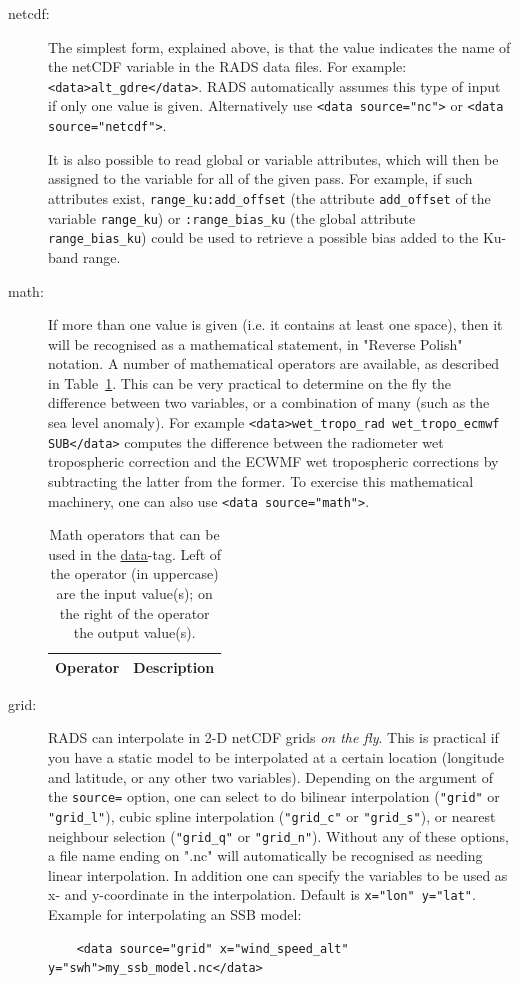 \documentclass[a4paper,11pt,openany,natbib,nomargin]{thesis}
\makeatletter
\newcommand\ctag[1]{\url{#1}\index{configuration!#1@\protect\cmd{#1}}}
\makeatother
\begin{document}
\begin{description}
\item[netcdf:] The simplest form, explained above, is that the value indicates the name of the netCDF variable in the RADS data files. For example: \verb|<data>alt_gdre</data>|. RADS automatically assumes this type of input if only one value is given. Alternatively use \verb|<data source="nc">| or \verb|<data source="netcdf">|.

It is also possible to read global or variable attributes, which will then be assigned to the variable for all of the given pass. For example, if such attributes exist, \verb|range_ku:add_offset| (the attribute \verb|add_offset| of the variable \verb|range_ku|) or \verb|:range_bias_ku| (the global attribute \verb|range_bias_ku|) could be used to retrieve a possible bias added to the Ku-band range.
\item[math:] If more than one value is given (i.e. it contains at least one space), then it will be recognised as a mathematical statement, in "Reverse Polish" notation. A number of mathematical operators are available, as described in Table~\ref{tab:math-operators}. This can be very practical to determine on the fly the difference between two variables, or a combination of many (such as the sea level anomaly). For example \verb|<data>wet_tropo_rad wet_tropo_ecmwf SUB</data>| computes the difference between the radiometer wet tropospheric correction and the ECWMF wet tropospheric corrections by subtracting the latter from the former. To exercise this mathematical machinery, one can also use \verb|<data source="math">|.

\begin{table}
\tiny
\begin{tabular}{p{}p{}}
\hline
Operator & Description \\
\hline

\end{tabular}
\caption{Math operators that can be used in the \protect\ctag{data}-tag. Left of the operator (in uppercase) are the input value(s); on the right of the operator the output value(s).}
\label{tab:math-operators}
\end{table}

\item[grid:] RADS can interpolate in 2-D netCDF grids \emph{on the fly}. This is practical if you have a static model to be interpolated at a certain location (longitude and latitude, or any other two variables). Depending on the argument of the \verb|source=| option, one can select to do bilinear interpolation (\verb|"grid"| or \verb|"grid_l"|), cubic spline interpolation (\verb|"grid_c"| or \verb|"grid_s"|), or nearest neighbour selection (\verb|"grid_q"| or \verb|"grid_n"|). Without any of these options, a file name ending on ".nc" will automatically be recognised as needing linear interpolation. In addition one can specify the variables to be used as x- and y-coordinate in the interpolation. Default is \verb|x="lon" y="lat"|. Example for interpolating an SSB model:
\begin{verbatim}
    <data source="grid" x="wind_speed_alt" y="swh">my_ssb_model.nc</data>
\end{verbatim}


\end{description}
\end{document}
